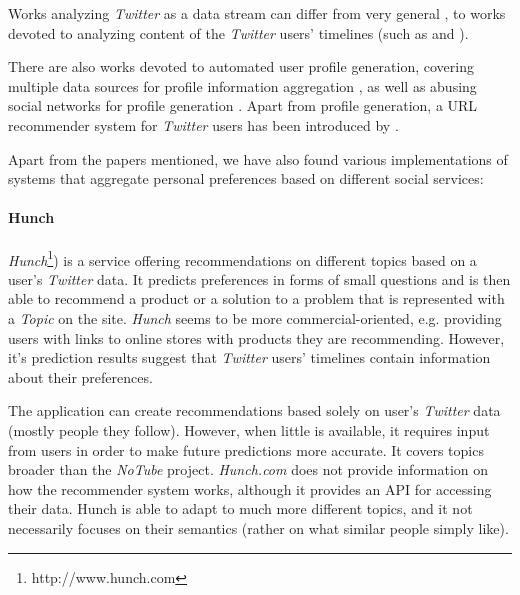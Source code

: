 Works analyzing \textit{Twitter} as a data stream can differ from very general \cite{why-we-twitter},
to works devoted to analyzing content of the \textit{Twitter} users' timelines (such as \cite{twitter-content-is-it} and \cite{short-tweet}).

There are also works devoted to automated user profile generation, covering multiple data sources for profile
information aggregation \cite{public-profiles}, as well as abusing social networks for profile generation \cite{twitter-abuse}. Apart from profile generation, a URL recommender system for \textit{Twitter} users
has been introduced by \cite{short-tweet}.

Apart from the papers mentioned, we have also found various implementations of systems that aggregate personal preferences based on different
social services:

\paragraph{Hunch}
\textit{Hunch}\footnote[2]{http://www.hunch.com}) is a service offering recommendations on different topics based on a user's \textit{Twitter} data. It predicts preferences in forms of small questions and is then able to recommend a product or a solution to a problem that is represented with a \textit{Topic} on the site. \textit{Hunch} seems to be more commercial-oriented, e.g. providing users with links to online stores with products they are recommending. However,
it's prediction results suggest that \textit{Twitter} users' timelines contain information about their preferences.

The application can create recommendations based solely on user's \textit{Twitter} data (mostly people they follow). However, when little is available, it requires input from users in order to make future predictions more accurate. It covers topics broader than the \textit{NoTube} project.
\textit{Hunch.com} does not provide information on how the recommender system works, although it provides an API for accessing their data.
Hunch is able to adapt to much more different topics, and it not necessarily focuses on their semantics (rather on what similar people simply like).